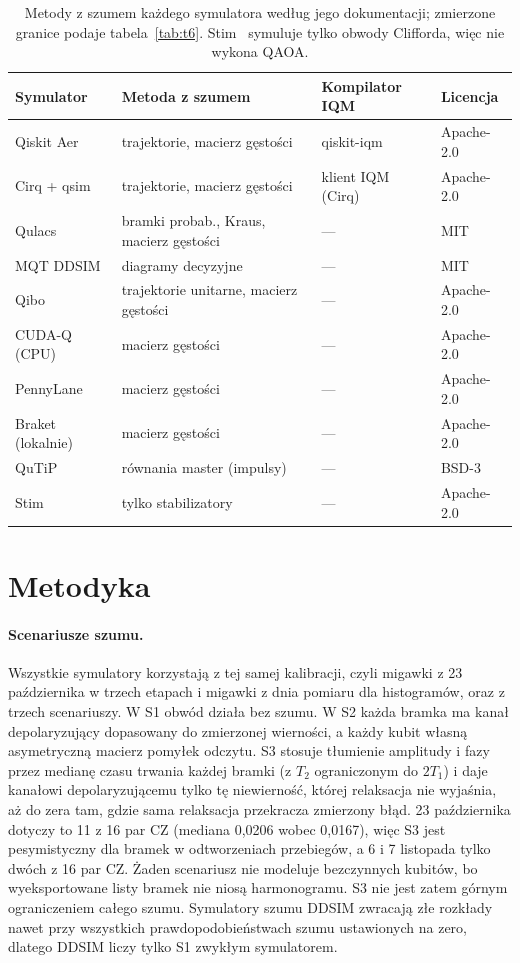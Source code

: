 \documentclass{scspaperproc}
\begin{document}
\begin{table}[t]
\caption{Metody z szumem każdego symulatora według jego dokumentacji; zmierzone
granice podaje tabela~\ref{tab:t6}. Stim~\cite{gidney2021stim} symuluje tylko
obwody Clifforda, więc nie wykona QAOA.}
\label{tab:sims}
\centering
\small
\begin{tabular}{llll}
\toprule
Symulator & Metoda z szumem & Kompilator IQM & Licencja \\
\midrule
Qiskit Aer & trajektorie, macierz gęstości & qiskit-iqm & Apache-2.0 \\
Cirq + qsim & trajektorie, macierz gęstości & klient IQM (Cirq) & Apache-2.0 \\
Qulacs & bramki probab., Kraus, macierz gęstości & --- & MIT \\
MQT DDSIM & diagramy decyzyjne & --- & MIT \\
Qibo & trajektorie unitarne, macierz gęstości & --- & Apache-2.0 \\
CUDA-Q (CPU) & macierz gęstości & --- & Apache-2.0 \\
PennyLane & macierz gęstości & --- & Apache-2.0 \\
Braket (lokalnie) & macierz gęstości & --- & Apache-2.0 \\
QuTiP & równania master (impulsy) & --- & BSD-3 \\
Stim & tylko stabilizatory & --- & Apache-2.0 \\
\bottomrule
\end{tabular}
\end{table}

\section{Metodyka}
\label{sec:method}

\paragraph{Scenariusze szumu.}
Wszystkie symulatory korzystają z tej samej kalibracji, czyli migawki
z 23 października w trzech etapach i migawki z dnia pomiaru dla histogramów,
oraz z trzech scenariuszy. W S1 obwód działa bez szumu. W S2 każda bramka ma
kanał depolaryzujący dopasowany do zmierzonej wierności, a każdy kubit własną
asymetryczną macierz pomyłek odczytu. S3 stosuje tłumienie amplitudy i fazy
przez medianę czasu trwania każdej bramki (z $T_2$ ograniczonym do $2T_1$)
i daje kanałowi depolaryzującemu tylko tę niewierność, której relaksacja nie
wyjaśnia, aż do zera tam, gdzie sama relaksacja przekracza zmierzony błąd.
23 października dotyczy to 11 z 16 par CZ (mediana 0,0206 wobec 0,0167), więc
S3 jest pesymistyczny dla bramek w odtworzeniach przebiegów, a 6 i 7 listopada
tylko dwóch z 16 par CZ. Żaden scenariusz nie modeluje bezczynnych kubitów, bo
wyeksportowane listy bramek nie niosą harmonogramu. S3 nie jest zatem górnym ograniczeniem całego
szumu. Symulatory szumu DDSIM zwracają złe rozkłady nawet przy
wszystkich prawdopodobieństwach szumu ustawionych na zero, dlatego DDSIM liczy tylko S1 zwykłym symulatorem.
\end{document}
